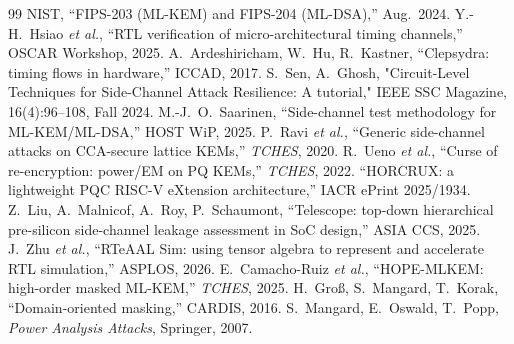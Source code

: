 \documentclass[10pt,conference]{IEEEtran}
\begin{document}

\begin{thebibliography}{99}\fontsize{6}{7}\selectfont\setlength{\itemsep}{0pt}\setlength{\parsep}{0pt}\setlength{\leftmargin}{8pt}
 NIST, ``FIPS-203 (ML-KEM) and FIPS-204 (ML-DSA),'' Aug.\ 2024.
 Y.-H.~Hsiao \emph{et al.}, ``RTL verification of micro-architectural timing channels,'' OSCAR Workshop, 2025.
 A.~Ardeshiricham, W.~Hu, R.~Kastner, ``Clepsydra: timing flows in hardware,'' ICCAD, 2017.
 S.~Sen, A.~Ghosh, "Circuit-Level Techniques for Side-Channel Attack Resilience: A tutorial," IEEE SSC Magazine, 16(4):96--108, Fall 2024.
 M.-J.~O.~Saarinen, ``Side-channel test methodology for ML-KEM/ML-DSA,'' HOST WiP, 2025.
 P.~Ravi \emph{et al.}, ``Generic side-channel attacks on CCA-secure lattice KEMs,'' \emph{TCHES}, 2020.
 R.~Ueno \emph{et al.}, ``Curse of re-encryption: power/EM on PQ KEMs,'' \emph{TCHES}, 2022.
 ``HORCRUX: a lightweight PQC RISC-V eXtension architecture,'' IACR ePrint 2025/1934.
 Z.~Liu, A.~Malnicof, A.~Roy, P.~Schaumont, ``Telescope: top-down hierarchical pre-silicon side-channel leakage assessment in SoC design,'' ASIA CCS, 2025.
 J.~Zhu \emph{et al.}, ``RTeAAL Sim: using tensor algebra to represent and accelerate RTL simulation,'' ASPLOS, 2026.
 E.~Camacho-Ruiz \emph{et al.}, ``HOPE-MLKEM: high-order masked ML-KEM,'' \emph{TCHES}, 2025.
 H.~Gro{\ss}, S.~Mangard, T.~Korak, ``Domain-oriented masking,'' CARDIS, 2016.
 S.~Mangard, E.~Oswald, T.~Popp, \emph{Power Analysis Attacks}, Springer, 2007.
\end{thebibliography}
\end{document}
